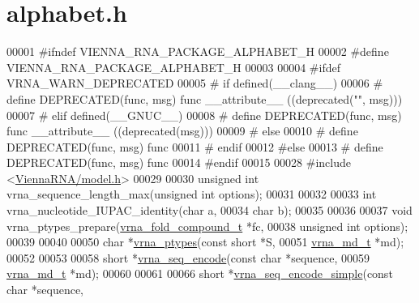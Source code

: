 \hypertarget{alphabet_8h_source}{}\section{alphabet.\+h}
\label{alphabet_8h_source}

\begin{DoxyCode}
00001 \textcolor{preprocessor}{#ifndef VIENNA\_RNA\_PACKAGE\_ALPHABET\_H}
00002 \textcolor{preprocessor}{#define VIENNA\_RNA\_PACKAGE\_ALPHABET\_H}
00003 
00004 \textcolor{preprocessor}{#ifdef VRNA\_WARN\_DEPRECATED}
00005 \textcolor{preprocessor}{# if defined(\_\_clang\_\_)}
00006 \textcolor{preprocessor}{#  define DEPRECATED(func, msg) func \_\_attribute\_\_ ((deprecated("", msg)))}
00007 \textcolor{preprocessor}{# elif defined(\_\_GNUC\_\_)}
00008 \textcolor{preprocessor}{#  define DEPRECATED(func, msg) func \_\_attribute\_\_ ((deprecated(msg)))}
00009 \textcolor{preprocessor}{# else}
00010 \textcolor{preprocessor}{#  define DEPRECATED(func, msg) func}
00011 \textcolor{preprocessor}{# endif}
00012 \textcolor{preprocessor}{#else}
00013 \textcolor{preprocessor}{# define DEPRECATED(func, msg) func}
00014 \textcolor{preprocessor}{#endif}
00015 
00028 \textcolor{preprocessor}{#include <\hyperlink{model_8h}{ViennaRNA/model.h}>}
00029 
00030 \textcolor{keywordtype}{unsigned} \textcolor{keywordtype}{int} vrna\_sequence\_length\_max(\textcolor{keywordtype}{unsigned} \textcolor{keywordtype}{int} options);
00031 
00032 
00033 \textcolor{keywordtype}{int} vrna\_nucleotide\_IUPAC\_identity(\textcolor{keywordtype}{char} a,
00034                                    \textcolor{keywordtype}{char} b);
00035 
00036 
00037 \textcolor{keywordtype}{void} vrna\_ptypes\_prepare(\hyperlink{group__fold__compound_structvrna__fc__s}{vrna\_fold\_compound\_t} *fc,
00038                          \textcolor{keywordtype}{unsigned} \textcolor{keywordtype}{int}         options);
00039 
00040 
00050 \textcolor{keywordtype}{char} *\hyperlink{group__utils_ga51a9e86a5f731f5f2f5584ee67cee4a8}{vrna\_ptypes}(\textcolor{keyword}{const} \textcolor{keywordtype}{short} *S,
00051                   \hyperlink{group__model__details_structvrna__md__s}{vrna\_md\_t}   *md);
00052 
00053 
00058 \textcolor{keywordtype}{short} *\hyperlink{group__utils_ga636e7d6f888fd639587296a5eddea660}{vrna\_seq\_encode}(\textcolor{keyword}{const} \textcolor{keywordtype}{char} *sequence,
00059                        \hyperlink{group__model__details_structvrna__md__s}{vrna\_md\_t}  *md);
00060 
00061 
00066 \textcolor{keywordtype}{short} *\hyperlink{group__utils_ga3cd79d21d53248ad2634c1c0d43e97d7}{vrna\_seq\_encode\_simple}(\textcolor{keyword}{const} \textcolor{keywordtype}{char}  *sequence,

\end{DoxyCode}
